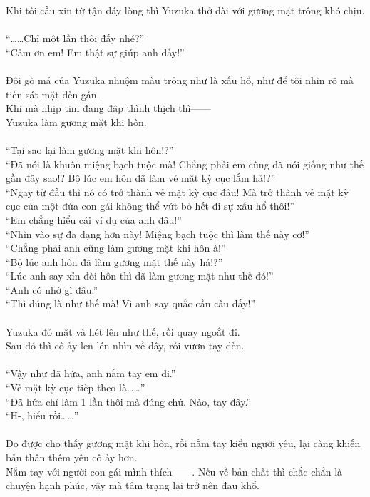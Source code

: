 \documentclass[12pt,a4paper, twosides]{book}
\begin{document}
Khi tôi cầu xin từ tận đáy lòng thì Yuzuka thở dài với gương mặt trông khó chịu.\\
\\
“……Chỉ một lần thôi đấy nhé?”\\
“Cảm ơn em! Em thật sự giúp anh đấy!”\\
\\
Đôi gò má của Yuzuka nhuộm màu trông như là xấu hổ, như để tôi nhìn rõ mà tiến sát mặt đến gần.\\
Khi mà nhịp tim đang đập thình thịch thì——\\
Yuzuka làm gương mặt khi hôn.\\
\\
“Tại sao lại làm gương mặt khi hôn!?”\\
“Đã nói là khuôn miệng bạch tuộc mà! Chẳng phải em cũng đã nói giống như thế gần đây sao!? Bộ lúc em hôn đã làm vẻ mặt kỳ cục lắm hả!?”\\
“Ngay từ đầu thì nó có trở thành vẻ mặt kỳ cục đâu! Mà trở thành vẻ mặt kỳ cục của một đứa con gái không thể vứt bỏ hết đi sự xấu hổ thôi!”\\
“Em chẳng hiểu cái ví dụ của anh đâu!”\\
“Nhìn vào sự đa dạng hơn này! Miệng bạch tuộc thì làm thế này cơ!”\\
“Chẳng phải anh cũng làm gương mặt khi hôn à!”\\
“Bộ lúc anh hôn đã làm gương mặt thế này hả!?”\\
“Lúc anh say xỉn đòi hôn thì đã làm gương mặt như thế đó!”\\
“Anh có nhớ gì đâu.”\\
“Thì đúng là như thế mà! Vì anh say quắc cần câu đấy!”\\
\\
Yuzuka đỏ mặt và hét lên như thế, rồi quay ngoắt đi.\\
Sau đó thì cô ấy len lén nhìn về đây, rồi vươn tay đến.\\
\\
“Vậy như đã hứa, anh nắm tay em đi.”\\
“Vẻ mặt kỳ cục tiếp theo là……”\\
“Đã hứa chỉ làm 1 lần thôi mà đúng chứ. Nào, tay đây.”\\
“H-, hiểu rồi……”\\
\\
Do được cho thấy gương mặt khi hôn, rồi nắm tay kiểu người yêu, lại càng khiến bản thân thêm yêu cô ấy hơn.\\
Nắm tay với người con gái mình thích——. Nếu về bản chất thì chắc chắn là chuyện hạnh phúc, vậy mà tâm trạng lại trở nên đau khổ.\\
\end{document}

